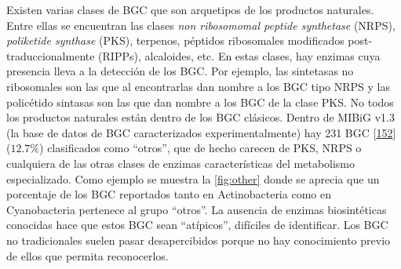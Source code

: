 \documentclass[12pt,twoside]{reedthesis}
\begin{document}
  Existen varias clases de BGC que son arquetipos de los productos
  naturales. Entre ellas se encuentran las clases \emph{non ribosomomal
  peptide synthetase} (NRPS), \emph{poliketide synthase} (PKS), terpenos,
  péptidos ribosomales modificados post-traduccionalmente (RIPPs),
  alcaloides, etc. En estas clases, hay enzimas cuya presencia lleva a la
  detección de los BGC. Por ejemplo, las sintetasas no ribosomales son las
  que al encontrarlas dan nombre a los BGC tipo NRPS y las policétido
  sintasas son las que dan nombre a los BGC de la clase PKS. No todos los
  productos naturales están dentro de los BGC clásicos. Dentro de MIBiG
  v1.3 (la base de datos de BGC caracterizados experimentalmente) hay 231
  BGC {[}\protect\hyperlink{ref-medema_minimum_2015}{152}{]} (\(12.7\%\))
  clasificados como ``otros'', que de hecho carecen de PKS, NRPS o
  cualquiera de las otras clases de enzimas características del
  metabolismo especializado. Como ejemplo se muestra la
  \autoref{fig:other} donde se aprecia que un porcentaje de los BGC
  reportados tanto en Actinobacteria como en Cyanobacteria pertenece al
  grupo ``otros''. La ausencia de enzimas biosintéticas conocidas hace que
  estos BGC sean ``atípicos'', difíciles de identificar. Los BGC no
  tradicionales suelen pasar desapercibidos porque no hay conocimiento
  previo de ellos que permita reconocerlos.
  
\end{document}
